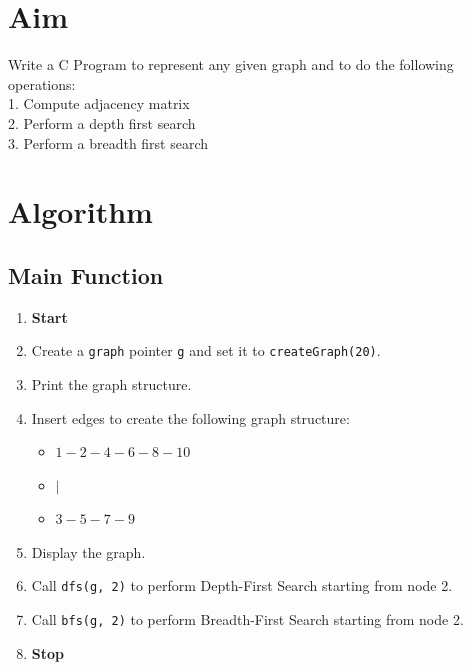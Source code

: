 
\section{Aim}
Write a C Program to represent any given graph and to do the following operations:
\\1. Compute adjacency matrix
\\2. Perform a depth first search
\\3. Perform a breadth first search

\section{Algorithm}
 {\selectfont
  \subsection{Main Function}
  \begin{enumerate}[label=\arabic*:,left=0pt]
    \item \textbf{Start}
    \item Create a \texttt{graph} pointer \texttt{g} and set it to \texttt{createGraph(20)}.
    \item Print the graph structure.
    \item Insert edges to create the following graph structure:
          \begin{itemize}
            \item \(1 - 2 - 4 - 6 - 8 - 10\)
            \item \(|\)
            \item \(3 - 5 - 7 - 9\)
          \end{itemize}
    \item Display the graph.
    \item Call \texttt{dfs(g, 2)} to perform Depth-First Search starting from node 2.
    \item Call \texttt{bfs(g, 2)} to perform Breadth-First Search starting from node 2.
    \item \textbf{Stop}
  \end{enumerate}

}
